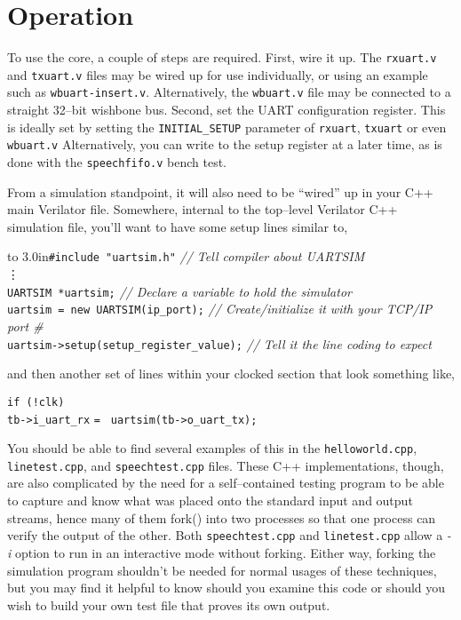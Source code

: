 \documentclass{gqtekspec}
\begin{document}
\chapter{Operation}\label{ch:ops}

%

To use the core, a couple of steps are required.  First, wire it up.  The
{\tt rxuart.v} and {\tt txuart.v} files may be wired up for use individually,
or using an example such as {\tt wbuart-insert.v}.  Alternatively, the 
{\tt wbuart.v} file may be connected to a straight 32--bit wishbone bus.
Second, set the UART configuration register.  This is ideally set by setting
the {\tt INITIAL\_SETUP} parameter of {\tt rxuart}, {\tt txuart} or even
{\tt wbuart.v}  Alternatively, you can write to the setup register at a later
time, as is done with the {\tt speechfifo.v} bench test.

From a simulation standpoint, it will also need to be ``wired'' up in your
C++ main Verilator file.  Somewhere, internal to the top--level Verilator
C++ simulation file, you'll want to have some setup lines similar to,
\begin{tabbing}
\hbox to 3.0in{\tt \#include "uartsim.h"} \= {\em // Tell compiler about UARTSIM}\\
\vdots \\
{\tt UARTSIM *uartsim;} \> {\em // Declare a variable to hold the simulator}\\
{\tt uartsim = new UARTSIM(ip\_port);} \> {\em // Create/initialize it with your TCP/IP port \#} \\
{\tt uartsim->setup(setup\_register\_value);} \> {\em // Tell it the line coding to expect}\\
\end{tabbing}
and then another set of lines within your clocked section that look something
like,
\begin{tabbing}
{\tt if (!clk)} \= \\
\> {\tt tb->i\_uart\_rx} {\tt = } {\tt uartsim(tb->o\_uart\_tx);}
\end{tabbing}
You should be able to find several examples of this in the {\tt helloworld.cpp},
{\tt linetest.cpp}, and {\tt speechtest.cpp} files.  These C++ implementations,
though, are also complicated by the need for a self--contained testing program
to be able to capture and know what was placed onto the standard input and
output streams, hence many of them fork() into two processes so that one
process can verify the output of the other.  Both {\tt speechtest.cpp} and
{\tt linetest.cpp} allow a {\em -i} option to run in an interactive mode without
forking.  Either way, forking the simulation program shouldn't be needed for
normal usages of these techniques, but you may find it helpful to know should
you examine this code or should you wish to build your own test file that
proves its own output.
\end{document}
